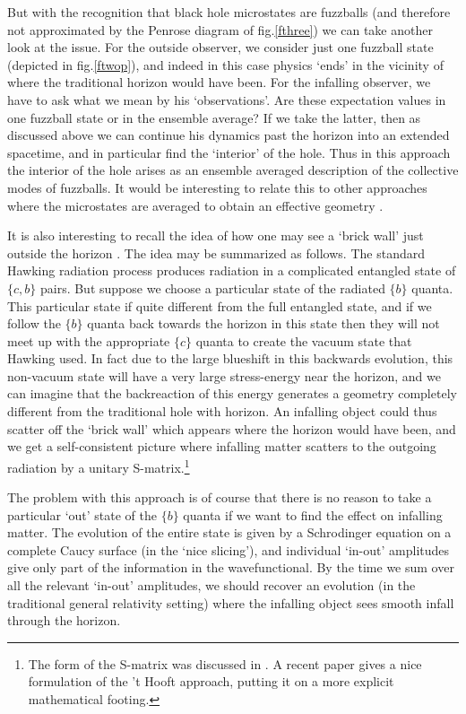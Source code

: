 \documentclass[11pt]{article}
\begin{document}
But with the recognition that black hole microstates are fuzzballs (and therefore not approximated by the Penrose diagram of fig.\ref{fthree}) we can take another look at the issue. For the outside observer, we consider just one fuzzball state (depicted in fig.\ref{ftwop}), and indeed in this case physics `ends' in the vicinity of where the traditional horizon would have been.  For the infalling observer, we have to ask what we mean by his `observations'. Are these expectation values in one fuzzball state or in the ensemble average? If we take the latter, then as discussed above we can continue his dynamics past the horizon into an extended spacetime, and in particular find  the `interior' of the hole. Thus in this approach the interior of the hole arises as an ensemble averaged description of the collective modes of fuzzballs. It would be interesting to relate this to other approaches where the microstates are averaged to obtain an effective geometry \cite{bala}. 

It is also interesting to recall the idea of how one may see a `brick wall' just outside the horizon  \cite{thooft1}. The idea may be summarized as follows.  The standard Hawking radiation process produces radiation in a complicated entangled state of $\{ c, b\}$ pairs. But suppose we choose a particular state of the radiated $\{ b\} $ quanta. This particular state if quite different from the full entangled state, and if we follow the $\{ b\}$ quanta back towards the horizon in this state then they will not meet up with the appropriate $\{ c\}$ quanta to create the vacuum state that Hawking used. In fact due to the large blueshift in this backwards evolution, this non-vacuum state will have a very large stress-energy near the horizon, and we can imagine that the backreaction of this energy generates a geometry completely different from the traditional hole with horizon. An infalling object could thus scatter off the `brick wall'  which appears where the horizon would have been, and we  get a self-consistent picture where infalling matter scatters to the outgoing radiation by a unitary S-matrix.\footnote{The form of the S-matrix was discussed in \cite{thooft1,vv}. A recent paper \cite{englert} gives a nice formulation of the 't Hooft approach, putting it on a more explicit mathematical footing.}

The problem with this approach is of course that there is no reason to take a particular `out' state of the $\{ b\}$ quanta if we want to find the effect on infalling matter. The evolution of the entire state is given by a Schrodinger equation on a complete Caucy surface (in the `nice slicing'), and individual `in-out' amplitudes give only part of the information in the wavefunctional. By the time we sum over all the relevant `in-out' amplitudes, we should recover an evolution (in the traditional general relativity setting) where the infalling object sees smooth infall through the horizon.
\end{document}
